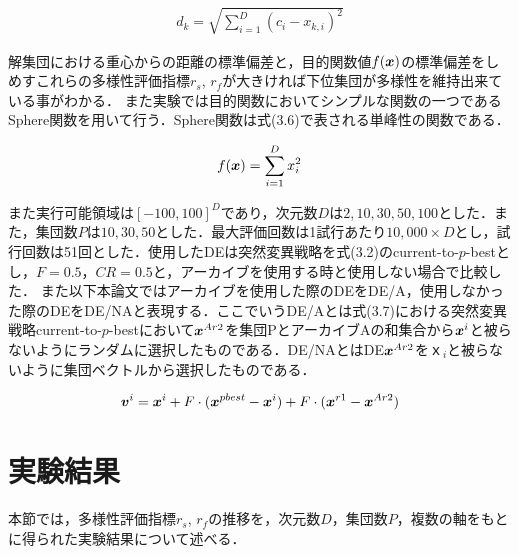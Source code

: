 \documentclass[a4paper,11pt,oneside,openany]{jsbook}
\def\vector#1{\mbox{\boldmath $#1$}}
\begin{document}
\begin{eqnarray}
d_{k} = \sqrt{\sum_{i=1}^{D} (c_i - x_{k,i})^2}
\end{eqnarray}

解集団における重心からの距離の標準偏差と，目的関数値$f(\vector{x})$の標準偏差をしめすこれらの多様性評価指標$r_s$, $r_f$が大きければ下位集団が多様性を維持出来ている事がわかる．
また実験では目的関数においてシンプルな関数の一つであるSphere関数を用いて行う．Sphere関数は式(3.6)で表される単峰性の関数である．

\begin{eqnarray}
  f(\vector{x}) = \sum_{i=1}^D x_i^2
\end{eqnarray}

また実行可能領域は$[-100, 100]^D$であり，次元数$D$は$2,10,30,50,100$とした．また，集団数$P$は$10,30,50$とした．最大評価回数は1試行あたり$10,000 \times D$とし，試行回数は51回とした．使用したDEは突然変異戦略を式(3.2)のcurrent-to-$p$-bestとし，$F=0.5$，$CR=0.5$と，アーカイブを使用する時と使用しない場合で比較した．
また以下本論文ではアーカイブを使用した際のDEをDE/A，使用しなかった際のDEをDE/NAと表現する．ここでいうDE/Aとは式(3.7)における突然変異戦略current-to-$p$-bestにおいて$\vector{x}^{Ar2}$を集団PとアーカイブAの和集合から${\vector{x}^i}$と被らないようにランダムに選択したものである．DE/NAとはDE$\vector{x}^{Ar2}$を$ｘ_{i}$と被らないように集団ベクトルから選択したものである．

\begin{eqnarray}
\vector{v}^{i} = \vector{x}^{i} + F\cdot(\vector{x}^{pbest} - \vector{x}^{i}) + F\cdot(\vector{x}^{r1} - \vector{x}^{Ar2})
\end{eqnarray}




\section{実験結果}
本節では，多様性評価指標$r_s$, $r_f$の推移を，次元数$D$，集団数$P$，複数の軸をもとに得られた実験結果について述べる．
\end{document}

